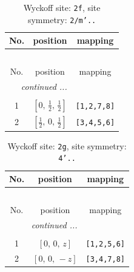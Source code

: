 \documentclass[fleqn,8pt]{jsarticle}
\begin{document}
\renewcommand{\arraystretch}{1.2}
\begin{longtable}{ccc}
\caption{Wyckoff site: {\tt 2f}, site symmetry: {\tt 2/m'..}}
 \\
 \hline \hline
No. & position & mapping \\ \hline \endfirsthead

\multicolumn{2}{l}{\tablename\ \thetable{}} \\
 \hline \hline
No. & position & mapping \\ \hline \endhead

 \hline \hline
\multicolumn{2}{r}{\footnotesize\it continued ...} \\ \endfoot

 \hline \hline
\multicolumn{2}{r}{} \\ \endlastfoot

1 & $\left[ 0,\, \frac{1}{2},\, \frac{1}{2} \right]$ & {\tt [1,2,7,8]} \\ \hline
2 & $\left[ \frac{1}{2},\, 0,\, \frac{1}{2} \right]$ & {\tt [3,4,5,6]} \\
\end{longtable}
\renewcommand{\arraystretch}{1.2}
\begin{longtable}{ccc}
\caption{Wyckoff site: {\tt 2g}, site symmetry: {\tt 4'..}}
 \\
 \hline \hline
No. & position & mapping \\ \hline \endfirsthead

\multicolumn{2}{l}{\tablename\ \thetable{}} \\
 \hline \hline
No. & position & mapping \\ \hline \endhead

 \hline \hline
\multicolumn{2}{r}{\footnotesize\it continued ...} \\ \endfoot

 \hline \hline
\multicolumn{2}{r}{} \\ \endlastfoot

1 & $\left[ 0,\, 0,\, z \right]$ & {\tt [1,2,5,6]} \\ \hline
2 & $\left[ 0,\, 0,\, - z \right]$ & {\tt [3,4,7,8]} \\
\end{longtable}
\renewcommand{\arraystretch}{1.2}
\end{document}
